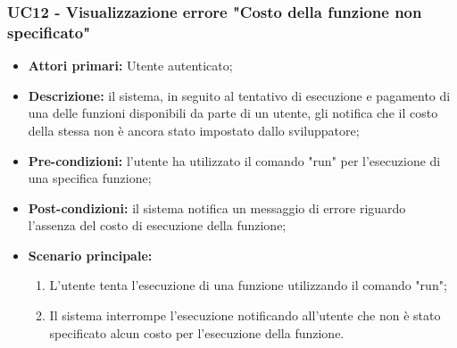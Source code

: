 \subsubsection{UC12 - Visualizzazione errore "Costo della funzione non specificato"}
\begin{itemize}
	\item \textbf{Attori primari:} Utente autenticato;
	\item \textbf{Descrizione:} il sistema, in seguito al tentativo di esecuzione e pagamento di una delle funzioni disponibili da parte di un utente, gli notifica che il costo della stessa non è ancora stato impostato dallo sviluppatore; 
	\item \textbf{Pre-condizioni:} l'utente ha utilizzato il comando "run" per l'esecuzione di una specifica funzione;
	\item \textbf{Post-condizioni:} il sistema notifica un messaggio di errore riguardo l'assenza del costo di esecuzione della funzione;
	\item \textbf{Scenario principale:} 
	\begin{enumerate}
		\item L'utente tenta l'esecuzione di una funzione utilizzando il comando "run";
		\item Il sistema interrompe l'esecuzione notificando all'utente che non è stato specificato alcun costo per l'esecuzione della funzione.
	\end{enumerate}
\end{itemize}